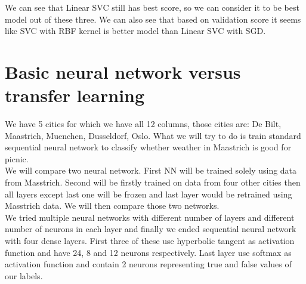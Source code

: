 \documentclass[a4paper]{article}
\begin{document}
	We can see that Linear SVC still has best score, so we can consider it to be best model out of these three. We can also see that based on validation score it seems like SVC with RBF kernel is better model than Linear SVC with SGD. 
	
	\newpage

	\section{Basic neural network versus transfer learning}
	
	We have 5 cities for which we have all 12 columns, those cities are: De Bilt, Maastrich, Muenchen, Dusseldorf, Oslo. What we will try to do is train standard sequential neural network to classify whether weather in Maastrich is good for picnic. 
	\\
	
	We will compare two neural network. First NN will be trained solely using data from Masstrich. Second will be firstly trained on data from four other cities then all layers except last one will be frozen and last layer would be retrained using Masstrich data. We will then compare those two networks.  
	\\
	
	We tried multiple neural networks with different number of layers and different number of neurons in each layer and finally we ended sequential neural network with four dense layers. First three of these use hyperbolic tangent as activation function and have 24, 8 and 12 neurons respectively. Last layer use softmax as activation function and contain 2 neurons representing true and false values of our labels.    
\end{document}

